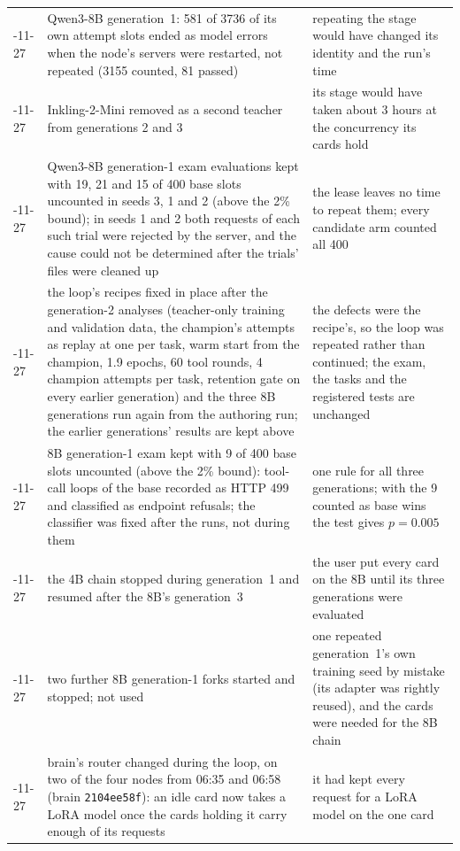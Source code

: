 {\begin{longtable}{>{\raggedright\arraybackslash}p{17mm}>{\raggedright\arraybackslash}p{64mm}>{\raggedright\arraybackslash}p{60mm}}
2026-11-27 & Qwen3-8B generation~1: 581 of 3736 of its own attempt slots ended as model errors when the node's servers were
restarted, not repeated (3155 counted, 81 passed) & repeating the stage would have changed its identity and the run's time \\
2026-11-27 & Inkling-2-Mini removed as a second teacher from generations 2 and 3 & its stage would have taken about 3 hours
at the concurrency its cards hold \\
2026-11-27 & Qwen3-8B generation-1 exam evaluations kept with 19, 21 and 15 of 400 base slots uncounted in seeds 3, 1 and 2
(above the 2\% bound); in seeds 1 and 2 both requests of each such trial were rejected by the server, and the cause could not
be determined after the trials' files were cleaned up & the lease leaves no time to repeat them; every candidate arm counted
all 400 \\
2026-11-27 & the loop's recipes fixed in place after the generation-2 analyses (teacher-only training and validation data,
the champion's attempts as replay at one per task, warm start from the champion, 1.9 epochs, 60 tool rounds, 4 champion attempts
per task, retention gate on every earlier generation) and the three 8B generations run again from the authoring run; the
earlier generations' results are kept above & the defects were the recipe's, so the loop was repeated rather than continued;
the exam, the tasks and the registered tests are unchanged \\
2026-11-27 & 8B generation-1 exam kept with 9 of 400 base slots uncounted (above the 2\% bound): tool-call loops of the base
recorded as HTTP 499 and classified as endpoint refusals; the classifier was fixed after the runs, not during them & one
rule for all three generations; with the 9 counted as base wins the test gives $p=0.005$ \\
2026-11-27 & the 4B chain stopped during generation~1 and resumed after the 8B's generation~3 & the user put every card on
the 8B until its three generations were evaluated \\
2026-11-27 & two further 8B generation-1 forks started and stopped; not used & one repeated generation~1's own
training seed by mistake (its adapter was rightly reused), and the cards were needed for the 8B chain \\
2026-11-27 & brain's router changed during the loop, on two of the four nodes from 06:35 and 06:58 (brain
\texttt{2104ee58f}): an idle card now takes a LoRA model once the cards holding it carry enough of its requests & it had kept every request for a LoRA model on the one card

\end{longtable}}
